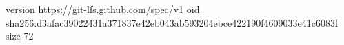 version https://git-lfs.github.com/spec/v1
oid sha256:d3afac39022431a371837e42eb043ab593204ebce422190f4609033e41c6083f
size 72

